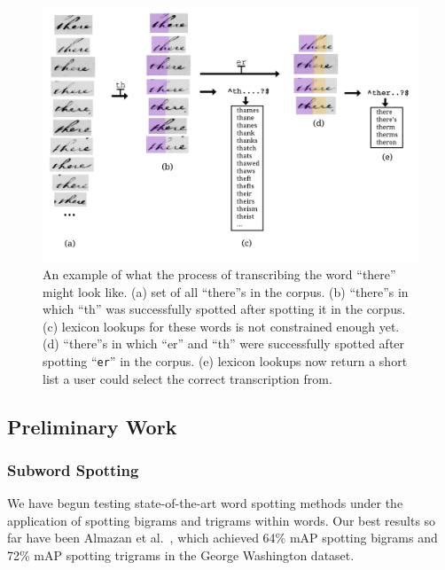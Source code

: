 \documentclass[ms]{byuprop}
\begin{document}
\begin{figure}
    \centering
    \includegraphics[width=.75\textwidth]{flow_ex}
    \caption{An example of what the process of transcribing the word ``there'' might look like. (a) set of all ``there''s in the corpus. (b) ``there''s in which ``th'' was successfully spotted after spotting it in the corpus. (c) lexicon lookups for these words is not constrained enough yet. (d) ``there''s in which ``er'' and ``th'' were successfully spotted after spotting ``\texttt{er}'' in the corpus. (e) lexicon lookups now return a short list a user could select the correct transcription from.}
    \label{fig:flow_ex}
\end{figure}


\subsection{Preliminary Work}

\subsubsection{Subword Spotting}
We have begun testing state-of-the-art word spotting methods under the application of spotting bigrams and trigrams within words. Our best results so far have been Almazan et al.~\cite{Almazan2014}, which achieved 64\% mAP spotting bigrams and 72\% mAP spotting trigrams in the George Washington dataset.
\end{document}
